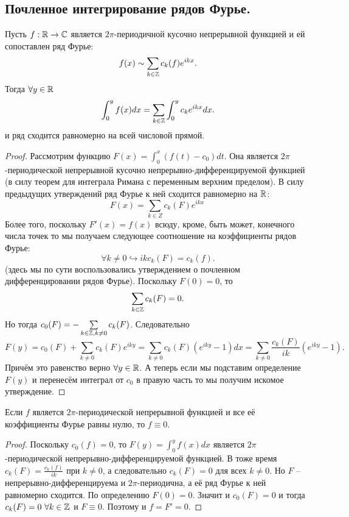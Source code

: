 \subsection{Почленное интегрирование рядов Фурье.}
\begin{theorem}
    Пусть $f: \mathbb{R} \to \mathbb{C}$ является $2\pi$-периодичной кусочно непрерывной функцией и ей сопоставлен ряд Фурье:
    \[
        f(x) \sim \sum\limits_{k \in \mathbb{Z}} c_k(f) e^{ikx}.
    \]
    Тогда $\forall y \in \mathbb{R}$
    \[
        \int_0^{y}f(x)dx = \sum\limits_{k \in \mathbb{Z}} \int_0^{y} c_k e^{ikx}dx.
    \]
    и ряд сходится равномерно на всей числовой прямой.
\end{theorem}
\begin{proof}
    Рассмотрим функцию $F(x) = \int_0^{x} (f(t) - c_0)dt$.
    Она является $2\pi$-периодической непрерывной кусочно непрерывно-дифференцируемой функцией (в силу теорем для интеграла Римана с переменным верхним пределом).
    В силу предыдущих утверждений ряд Фурье к ней сходится равномерно на $\mathbb{R}$:
    \[
        F(x) = \sum\limits_{k \in Z} c_k(F) e^{ikx} \
    \]
    Более того, поскольку $F'(x) = f(x)$ всюду, кроме, быть может, конечного числа точек то мы получаем следующее соотношение на коэффициенты рядов Фурье:
    \[
        \forall k \neq 0 \hookrightarrow ik c_k(F) = c_k(f).
    \]
    (здесь мы по сути воспользовались утверждением о почленном дифференцировании рядов Фурье).
    Поскольку $F(0) = 0$, то
    \[
        \sum\limits_{k \in \mathbb{Z}} c_k(F) = 0.
    \]
    Но тогда $c_0(F) = -\sum\limits_{k \in \mathbb{Z}, k \neq 0} c_k(F)$.
    Следовательно
    \[
        F(y) = c_0(F) + \sum\limits_{k \neq 0} c_k(F)e^{iky} = \sum\limits_{k \neq 0} c_k(F)(e^{iky} - 1)dx = \sum\limits_{k \neq 0} \dfrac{c_k(F)}{ik}(e^{iky} - 1).
    \]
    Причём это равенство верно $\forall y \in \mathbb{R}$.
    А теперь если мы подставим определение $F(y)$ и перенесём интеграл от $c_0$ в правую часть то мы получим искомое утверждение.
\end{proof}
\begin{corollary}
   Если $f$ является $2\pi$-периодической непрерывной функцией и все её коэффициенты Фурье равны нулю, то $f \equiv 0$.
\end{corollary}

\begin{proof}
    Поскольку $c_0(f) = 0$, то $F(y) = \int_0^{y} f(x)dx$ является $2\pi$-периодической непрерывно-дифференцируемой функцией.
    В тоже время $c_k(F) = \frac{c_k(f)}{ik}$ при $k \neq 0$, а следовательно $c_k(F) = 0$ для всех $k \neq 0$.
    Но $F$ -- непрерывно-дифференцируема и $2\pi$-периодична, а её ряд Фурье к ней равномерно сходится.
    По определению $F(0) = 0$.
    Значит и $c_0(F) = 0$ и тогда $c_k(F) = 0 \  \forall k \in \mathbb{Z}$ и $F \equiv 0$.
    Поэтому и $f = F' = 0$.
\end{proof}

